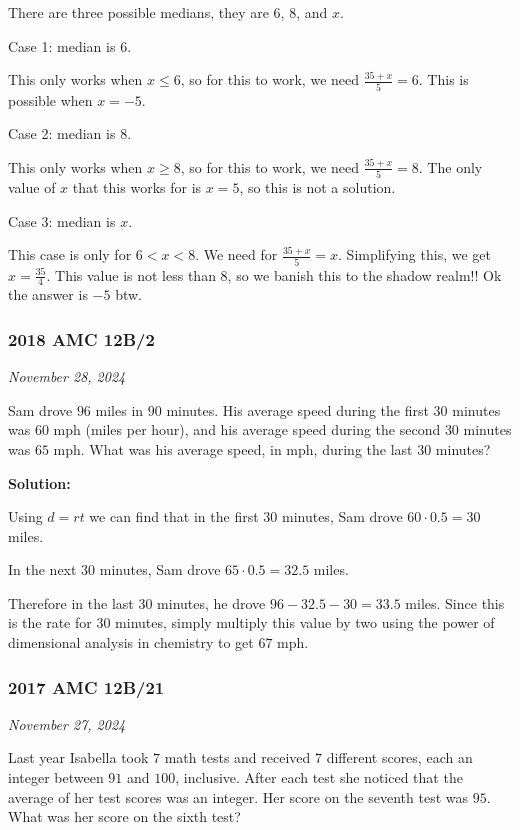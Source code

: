 \documentclass[../mathproblems.tex]{subfiles}
\begin{document}
There are three possible medians, they are $6$, $8$, and $x$.

Case 1: median is $6$.

This only works when $x\leq 6$, so for this to work, we need $\frac{35+x}{5}=6$. This is possible when $x=-5$.

Case 2: median is $8$.

This only works when $x\geq 8$, so for this to work, we need $\frac{35+x}{5}=8$. The only value of $x$ that this works for is $x=5$, so this is not a solution.

Case 3: median is $x$.

This case is only for $6 <x <8$. We need for $\frac{35+x}{5}=x$. Simplifying this, we get $x=\frac{35}{4}$. This value is not less than $8$, so we banish this to the shadow realm!! Ok the answer is $\boxed{-5}$ btw.

\noindent\hrulefill
\subsubsection*{2018 AMC 12B/2} 
\textit{November 28, 2024}

Sam drove $96$ miles in $90$ minutes. His average speed during the first $30$ minutes was $60$ mph (miles per hour), and his average speed during the second $30$ minutes was $65$ mph. What was his average speed, in mph, during the last $30$ minutes?

\textbf{Solution:}

Using $d=rt$ we can find that in the first $30$ minutes, Sam drove $60\cdot 0.5 = 30$ miles.

In the next $30$ minutes, Sam drove $65 \cdot 0.5 = 32.5$ miles.

Therefore in the last 30 minutes, he drove $96-32.5-30=33.5$ miles. Since this is the rate for 30 minutes, simply multiply this value by two using the power of dimensional analysis in chemistry to get $\boxed{67}$ mph.

\noindent\hrulefill
\subsubsection*{2017 AMC 12B/21} 

\textit{November 27, 2024}

Last year Isabella took $7$ math tests and received $7$ different scores, each an integer between $91$ and $100$, inclusive. After each test she noticed that the average of her test scores was an integer. Her score on the seventh test was $95$. What was her score on the sixth test?
\end{document}
